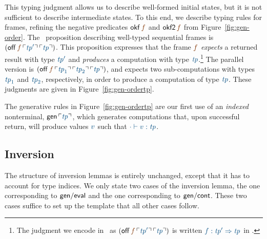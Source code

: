 This typing judgment allows us to describe well-formed initial states,
but it is not sufficient to describe intermediate states. To this end,
we describe typing rules for frames, refining the negative predicates
${\sf okf}\,\lf{f}$ and ${\sf okf2}\,\lf{f}$ from
Figure~\ref{fig:gen-order}. The \sls~proposition describing well-typed
sequential frames is $({\sf off}\,\lf{f}\,\interp{{\it
    tp}'}\,\interp{\it tp})$. This proposition expresses that the frame
$\lf{f}$ {\it expects} a returned result with type $\obj{\it tp'}$ and
{\it produces} a computation with type $\obj{{\it tp}}$.\footnote{The
  judgment we encode in \sls~as $({\sf off}\,\lf{f}\,\interp{{\it
      tp}'}\,\interp{\it tp})$ is written $\obj{f : {\it tp}'
    \Rightarrow {\it tp}}$ in \cite[Chapter 27]{harper12practical}.}
The parallel version is $({\sf off}\,\lf{f}\,\interp{{\it
    tp}_1}\,\interp{{\it tp}_2}\,\interp{\it tp})$, and expects two
sub-computations with types $\obj{{\it tp}_1}$ and $\obj{{\it tp}_2}$,
respectively, in order to produce a computation of type $\obj{{\it
    tp}}$. These judgments are given in Figure~\ref{fig:gen-ordertp}. 

The generative rules in Figure~\ref{fig:gen-ordertp} are our first use
of an {\it indexed} nonterminal, ${\sf gen}\,\interp{\it tp}$, which
generates computations that, upon successful return, will produce
values $\obj{v}$ such that $\obj{\cdot \vdash v : {\it tp}}$. 

\subsection{Inversion}

The structure of inversion lemmas is entirely unchanged, 
except that it has to account for type indices. We only state
two cases of the inversion lemma, the one corresponding to 
${\sf gen/eval}$ and the one corresponding to ${\sf gen/cont}$. 
These two cases suffice to set up the template that all other cases
follow. 

